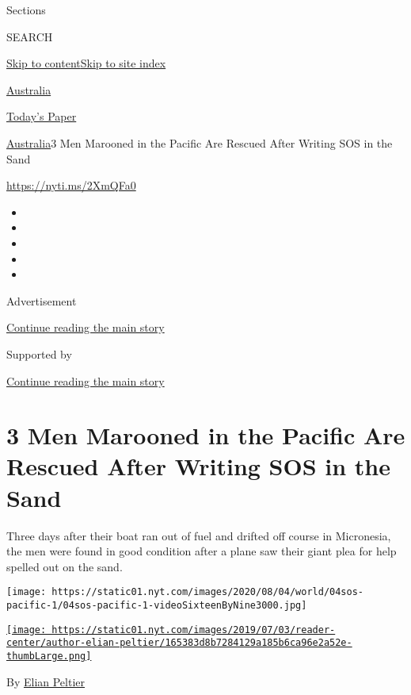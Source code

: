 Sections

SEARCH

\protect\hyperlink{site-content}{Skip to
content}\protect\hyperlink{site-index}{Skip to site index}

\href{https://www.nytimes.com/section/world/australia}{Australia}

\href{https://myaccount.nytimes.com/auth/login?response_type=cookie\&client_id=vi}{}

\href{https://www.nytimes.com/section/todayspaper}{Today's Paper}

\href{/section/world/australia}{Australia}\textbar{}3 Men Marooned in
the Pacific Are Rescued After Writing SOS in the Sand

\url{https://nyti.ms/2XmQFa0}

\begin{itemize}
\item
\item
\item
\item
\item
\end{itemize}

Advertisement

\protect\hyperlink{after-top}{Continue reading the main story}

Supported by

\protect\hyperlink{after-sponsor}{Continue reading the main story}

\hypertarget{3-men-marooned-in-the-pacific-are-rescued-after-writing-sos-in-the-sand}{%
\section{3 Men Marooned in the Pacific Are Rescued After Writing SOS in
the
Sand}\label{3-men-marooned-in-the-pacific-are-rescued-after-writing-sos-in-the-sand}}

Three days after their boat ran out of fuel and drifted off course in
Micronesia, the men were found in good condition after a plane saw their
giant plea for help spelled out on the sand.

\texttt{[image: https://static01.nyt.com/images/2020/08/04/world/04sos-pacific-1/04sos-pacific-1-videoSixteenByNine3000.jpg]}

\href{https://www.nytimes.com/by/elian-peltier}{\texttt{[image: https://static01.nyt.com/images/2019/07/03/reader-center/author-elian-peltier/165383d8b7284129a185b6ca96e2a52e-thumbLarge.png]}}

By \href{https://www.nytimes.com/by/elian-peltier}{Elian Peltier}

